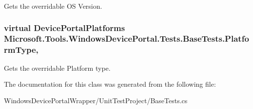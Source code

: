 Gets the overridable OS Version. 

\subsubsection[{\texorpdfstring{Platform\+Type}{PlatformType}}]{\setlength{\rightskip}{0pt plus 5cm}virtual Device\+Portal\+Platforms Microsoft.\+Tools.\+Windows\+Device\+Portal.\+Tests.\+Base\+Tests.\+Platform\+Type\hspace{0.3cm}{\ttfamily [get]}, {\ttfamily [protected]}}\hypertarget{class_microsoft_1_1_tools_1_1_windows_device_portal_1_1_tests_1_1_base_tests_abb7f94adffdd94bf72f69e7c881131e1}{}\label{class_microsoft_1_1_tools_1_1_windows_device_portal_1_1_tests_1_1_base_tests_abb7f94adffdd94bf72f69e7c881131e1}


Gets the overridable Platform type. 



The documentation for this class was generated from the following file\+:\begin{DoxyCompactItemize}
\item 
Windows\+Device\+Portal\+Wrapper/\+Unit\+Test\+Project/Base\+Tests.\+cs\end{DoxyCompactItemize}
